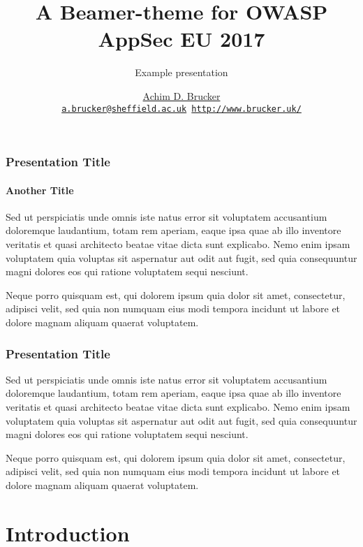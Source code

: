 \documentclass[9pt,aspectratio=169,classification=confidential]{appseceu2017}
\title{A Beamer-theme for OWASP AppSec EU 2017}
\subtitle{Example presentation}
\institute[The University of Sheffield]
{Department of Computer Science, The University of Sheffield, Sheffield, UK}
\author[A.D. Brucker] {%
    \href{http://www.brucker.uk/}{Achim D. Brucker}\\
    \texttt{\footnotesize\href{mailto:"Achim D. Brucker"
        <a.brucker@sheffield.ac.uk>}{a.brucker@sheffield.ac.uk}
      \hspace{.6cm}
      \url{http://www.brucker.uk/}}
    }
\begin{document}
\begin{frame}[plain]
  \maketitle
\end{frame}

\begin{frame}[t]
  \frametitle{Presentation Title}
  \framesubtitle{Another Title}
  Sed ut perspiciatis unde omnis iste natus error sit voluptatem accusantium doloremque
  laudantium, totam rem aperiam, eaque ipsa quae ab illo inventore veritatis et quasi architecto
  beatae vitae dicta sunt explicabo. Nemo enim ipsam voluptatem quia voluptas sit aspernatur aut
  odit aut fugit, sed quia consequuntur magni dolores eos qui ratione voluptatem sequi nesciunt.

  Neque porro quisquam est, qui dolorem ipsum quia dolor sit amet, consectetur, adipisci velit, sed
  quia non numquam eius modi tempora incidunt ut labore et dolore magnam aliquam quaerat
  voluptatem.
\end{frame}

\begin{frame}[t]
  \frametitle{Presentation Title}
  Sed ut perspiciatis unde omnis iste natus error sit voluptatem accusantium doloremque
  laudantium, totam rem aperiam, eaque ipsa quae ab illo inventore veritatis et quasi architecto
  beatae vitae dicta sunt explicabo. Nemo enim ipsam voluptatem quia voluptas sit aspernatur aut
  odit aut fugit, sed quia consequuntur magni dolores eos qui ratione voluptatem sequi nesciunt.

  Neque porro quisquam est, qui dolorem ipsum quia dolor sit amet, consectetur, adipisci velit, sed
  quia non numquam eius modi tempora incidunt ut labore et dolore magnam aliquam quaerat
  voluptatem.
\end{frame}

\AgendaFrame

\section{Introduction}
\end{document}
